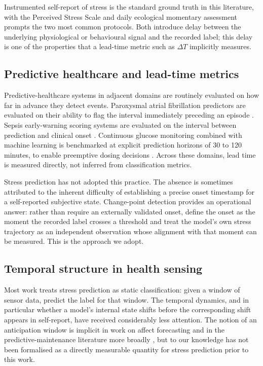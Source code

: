 \documentclass[preprint,12pt,authoryear]{elsarticle}
\newcommand{\dt}{$\Delta T$}
\begin{document}
Instrumented self-report of stress is the standard ground truth in this
literature, with the Perceived Stress Scale
\citep{cohen1983} and daily ecological momentary assessment prompts the
two most common protocols. Both introduce delay between the underlying
physiological or behavioural signal and the recorded label; this delay
is one of the properties that a lead-time metric such as \dt{}
implicitly measures.

\subsection{Predictive healthcare and lead-time metrics}

Predictive-healthcare systems in adjacent domains are routinely
evaluated on how far in advance they detect events. Paroxysmal atrial fibrillation
predictors are evaluated on their ability to flag the interval
immediately preceding an episode \citep{ebrahimzadeh2018}. Sepsis early-warning scoring
systems are evaluated on the interval between prediction and clinical
onset \citep{henry2015,goldstein2017}. Continuous glucose monitoring
combined with machine learning is benchmarked at explicit prediction
horizons of 30 to 120 minutes, to enable preemptive dosing
decisions \citep{debois2022}. Across these domains,
lead time is measured directly, not inferred from classification
metrics.

Stress prediction has not adopted this practice. The absence is
sometimes attributed to the inherent difficulty of establishing a
precise onset timestamp for a self-reported subjective state.
Change-point detection provides an operational answer: rather than
require an externally validated onset, define the onset as the moment
the recorded label crosses a threshold and treat the model's own
stress trajectory as an independent observation whose alignment
with that moment can be measured. This is the approach we adopt.

\subsection{Temporal structure in health sensing}

Most work treats stress prediction as static classification: given a
window of sensor data, predict the label for that window. The temporal
dynamics, and in particular whether a model's internal state shifts
before the corresponding shift appears in self-report, have received
considerably less attention. The notion of an anticipation window is
implicit in work on affect forecasting and in the predictive-maintenance
literature more broadly \citep{lei2018}, but to our knowledge has not
been formalised as a directly measurable quantity for stress prediction
prior to this work.
\end{document}
